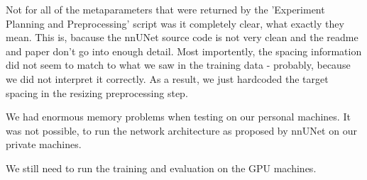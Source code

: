 \documentclass{article}
\begin{document}
		Not for all of the metaparameters that were returned by the 'Experiment Planning and Preprocessing' script was it completely clear, what exactly they mean. This is, bacause the nnUNet source code is not very clean and the readme and paper don't go into enough detail. Most importently, the spacing information did not seem to match to what we saw in the training data - probably, because we did not interpret it correctly. As a result, we just hardcoded the target spacing in the resizing preprocessing step.

		We had enormous memory problems when testing on our personal machines. It was not possible, to run the network architecture as proposed by nnUNet on our private machines.

		We still need to run the training and evaluation on the GPU machines.
\end{document}
